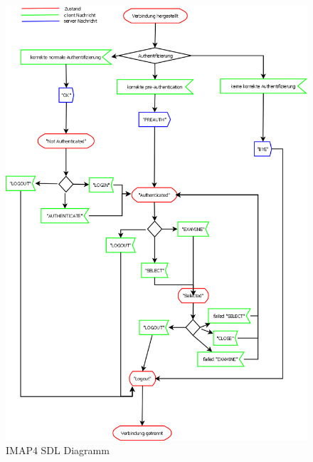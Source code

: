 \begin{figure}[htb]
	\centering
	\includegraphics[scale=0.4]{Content/Intro/Protokolle/IMAP4.png}
	\caption{IMAP4 SDL Diagramm}
	\label{fig:imap4}
\end{figure}

\vfill
\clearpage
